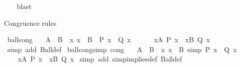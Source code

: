 \begin{isabellebody}
%
\isadelimproof
\ \ %
\endisadelimproof
%
\isatagproof
{}\isamarkupfalse%
\ blast%
\endisatagproof
{\isafoldproof}%
%
\isadelimproof
%
\endisadelimproof
%
\begin{isamarkuptext}%
Congruence rules%
\end{isamarkuptext}\isamarkuptrue%
\isamarkupfalse%
\ ball{\isacharunderscore}{\kern0pt}cong{\isacharcolon}{\kern0pt}\isanewline
\ \ {\isachardoublequoteopen}{\isasymlbrakk}\ A\ {\isacharequal}{\kern0pt}\ B{\isacharsemicolon}{\kern0pt}\ \ {\isasymAnd}x{\isachardot}{\kern0pt}\ x\ {\isasymin}\ B\ {\isasymLongrightarrow}\ P\ x\ {\isasymlongleftrightarrow}\ Q\ x\ {\isasymrbrakk}\ {\isasymLongrightarrow}\isanewline
\ \ \ \ {\isacharparenleft}{\kern0pt}{\isasymforall}x{\isasymin}A{\isachardot}{\kern0pt}\ P\ x{\isacharparenright}{\kern0pt}\ {\isasymlongleftrightarrow}\ {\isacharparenleft}{\kern0pt}{\isasymforall}x{\isasymin}B{\isachardot}{\kern0pt}\ Q\ x{\isacharparenright}{\kern0pt}{\isachardoublequoteclose}\isanewline
%
\isadelimproof
%
\endisadelimproof
%
\isatagproof
{}\isamarkupfalse%
\ {\isacharparenleft}{\kern0pt}simp\ add{\isacharcolon}{\kern0pt}\ Ball{\isacharunderscore}{\kern0pt}def{\isacharparenright}{\kern0pt}%
\endisatagproof
{\isafoldproof}%
%
\isadelimproof
\isanewline
%
\endisadelimproof
\isanewline
{}\isamarkupfalse%
\ ball{\isacharunderscore}{\kern0pt}cong{\isacharunderscore}{\kern0pt}simp\ {\isacharbrackleft}{\kern0pt}cong{\isacharbrackright}{\kern0pt}{\isacharcolon}{\kern0pt}\isanewline
\ \ {\isachardoublequoteopen}{\isasymlbrakk}\ A\ {\isacharequal}{\kern0pt}\ B{\isacharsemicolon}{\kern0pt}\ \ {\isasymAnd}x{\isachardot}{\kern0pt}\ x\ {\isasymin}\ B\ {\isacharequal}{\kern0pt}simp{\isacharequal}{\kern0pt}{\isachargreater}{\kern0pt}\ P\ x\ {\isasymlongleftrightarrow}\ Q\ x\ {\isasymrbrakk}\ {\isasymLongrightarrow}\isanewline
\ \ \ \ {\isacharparenleft}{\kern0pt}{\isasymforall}x{\isasymin}A{\isachardot}{\kern0pt}\ P\ x{\isacharparenright}{\kern0pt}\ {\isasymlongleftrightarrow}\ {\isacharparenleft}{\kern0pt}{\isasymforall}x{\isasymin}B{\isachardot}{\kern0pt}\ Q\ x{\isacharparenright}{\kern0pt}{\isachardoublequoteclose}\isanewline
%
\isadelimproof
%
\endisadelimproof
%
\isatagproof
{}\isamarkupfalse%
\ {\isacharparenleft}{\kern0pt}simp\ add{\isacharcolon}{\kern0pt}\ simp{\isacharunderscore}{\kern0pt}implies{\isacharunderscore}{\kern0pt}def\ Ball{\isacharunderscore}{\kern0pt}def{\isacharparenright}{\kern0pt}%
\endisatagproof
{\isafoldproof}%
%
\isadelimproof
\isanewline
%
\endisadelimproof
\isanewline
{}\isamarkupfalse%

\end{isabellebody}
